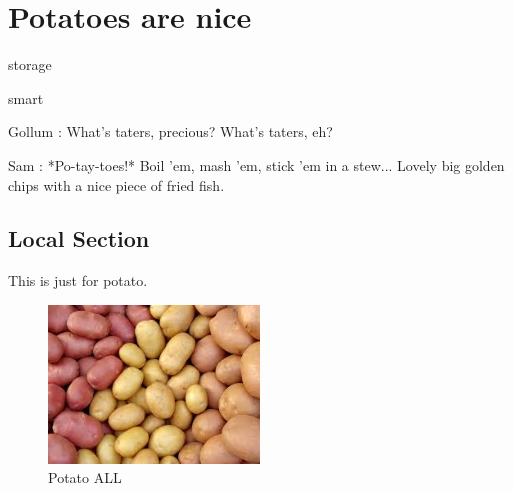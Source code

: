 \documentclass[../../../main.tex]{subfiles}
\begin{document}

\onlyonchapterfile{
\printglossary
\newpage

\printglossary[type=\acronymtype, title=Acrônimos]
\newpage
}




\chapter{Potatoes are nice}

\gls{storage}

\acrfull{smart} 


Gollum : What's taters, precious? What's taters, eh?

Sam : *Po-tay-toes!* Boil 'em, mash 'em, stick 'em in a stew... Lovely big golden chips with a nice piece of fried fish.

\lipsum[3-12]





\section{Local Section}

This is just for potato.

\begin{figure}[!htbp]
    \centering
    \includegraphics[width=0.5\textwidth]{./figures/potato_all.jpeg}
    \caption{Potato ALL}
    \label{fig:potato_all}
\end{figure}
\end{document}
